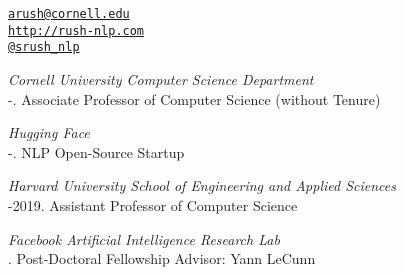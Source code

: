 \documentclass[10pt]{article}
\makeatletter
\def\myemail{arush@cornell.edu}
\def\myweb{http://rush-nlp.com}
\def\myphone{(215) 317-8089}
\def\myfax{srush\_nlp}
\makeatother
\begin{document}
\begin{minipage}[t]{2.95in}

\end{minipage}
\hfill
\hfill
\begin{minipage}[t]{1.7in}
  \flushright %
  {\scriptsize  \texttt{\href{mailto:\myemail}{\myemail}}} \\
  {\scriptsize  \texttt{\href{\myweb}{\myweb}}} \\
  {\scriptsize  \texttt{\href{http://twitter.com/\myfax}{@\myfax}}} \\
\end{minipage}


\medskip

\reversemarginpar
\medskip


\noindent\emph{Cornell University Computer Science Department \vspace{0.01in}}\\
-.  Associate Professor of Computer Science (without Tenure)

\medskip
\noindent\emph{Hugging Face \vspace{0.01in}}\\
-.  NLP Open-Source Startup

\medskip
\noindent\emph{Harvard University School of Engineering and Applied Sciences \vspace{0.01in}}\\
-2019.  Assistant Professor of Computer Science

\medskip
\noindent\emph{Facebook Artificial Intelligence Research Lab \vspace{0.01in}}\\
.  Post-Doctoral Fellowship Advisor: Yann LeCunn

\bigskip

\end{document}
